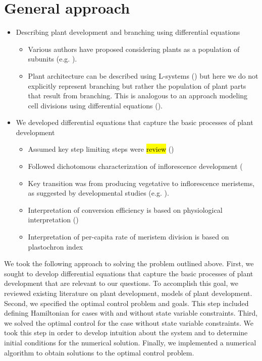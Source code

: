 \documentclass[12pt, oneside,titlepage]{article}   	%
\begin{document}
\section{General approach}

\singlespace
\begin{itemize}
\item Describing plant development and branching using differential equations

\begin{itemize}
\item Various authors have proposed considering plants as a population of subunits (e.g. \cite{white1979}).
\item Plant architecture can be described using L-systems (\cite{prusinkiewicz2007}) but here we do not explicitly represent branching but rather the population of plant parts that result from branching. This is analogous to an approach modeling cell divisions using differential equations (\cite{itzkovitz2012}).
\end{itemize}

\item We developed differential equations that capture the basic processes of plant development 

\begin{itemize}
\item Assumed key step limiting steps were \hl{review} (\cite{fox1992})
\item Followed dichotomous characterization of inflorescence development (\cite{kellogg2000}
\item Key transition was from producing vegetative to inflorescence meristems, as suggested by developmental studies (e.g. \cite{bradley1997}).
\item Interpretation of conversion efficiency is based on physiological interpretation (\cite{ackerly1999})
\item Interpretation of per-capita rate of meristem division is based on plastochron index
\end{itemize}

\end{itemize}
\doublespace

We took the following approach to solving the problem outlined above. First, we sought to develop differential equations that capture the basic processes of plant development that are relevant to our questions. To accomplish this goal, we reviewed existing literature on plant development, models of plant development. Second, we specified the optimal control problem and goals. This step included defining Hamiltonian for cases with and without state variable constraints. Third, we solved the optimal control for the case without state variable constraints. We took this step in order to develop intuition about the system and to determine initial conditions for the numerical solution. Finally, we implemented a numerical algorithm to obtain solutions to the optimal control problem. 
\end{document}

